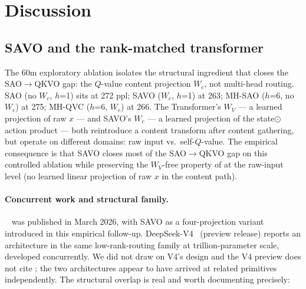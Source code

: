 \section{Discussion}\label{sec:6}

\subsection{SAVO and the rank-matched transformer}\label{sec:6.1}

The 60m exploratory ablation isolates the structural ingredient that closes the SAO$\to$QKVO gap: the $Q$-value content projection $W_c$, not multi-head routing. SAO (no $W_c$, $h$=1) sits at 272 ppl; SAVO ($W_c$, $h$=1) at 263; MH-SAO ($h$=6, no $W_c$) at 275; MH-QVC ($h$=6, $W_c$) at 266. The Transformer's $W_V$ --- a learned projection of raw $x$ --- and SAVO's $W_c$ --- a learned projection of the state$\odot$action product --- both reintroduce a content transform after content gathering, but operate on different domains: raw input vs.\ self-$Q$-value. The empirical consequence is that SAVO closes most of the SAO$\to$QKVO gap on this controlled ablation while preserving the $W_V$-free property of \QC{} at the raw-input level (no learned linear projection of raw $x$ in the content path).

\paragraph{Concurrent work and structural family.}
\QC{}~\cite{ref1} was published in March 2026, with SAVO as a four-projection variant introduced in this empirical follow-up. DeepSeek-V4~\cite{ref18} (preview release) reports an architecture in the same low-rank-routing family at trillion-parameter scale, developed concurrently. We did not draw on V4's design and the V4 preview does not cite \QC{}; the two architectures appear to have arrived at related primitives independently. The structural overlap is real and worth documenting precisely:

